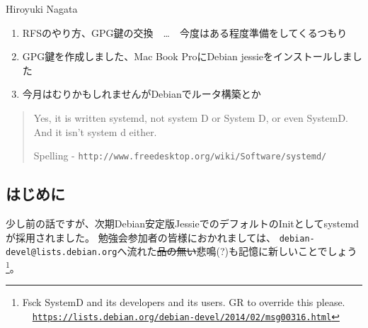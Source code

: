 \documentclass[mingoth,a4paper]{jsarticle}
\begin{document}
\begin{prework}{ Hiroyuki Nagata }
  \begin{enumerate}
  \item RFSのやり方、GPG鍵の交換　…　今度はある程度準備をしてくるつもり
  \item GPG鍵を作成しました、Mac Book ProにDebian jessieをインストールしました
  \item 今月はむりかもしれませんがDebianでルータ構築とか
  \end{enumerate}
\end{prework}


\begin{quote}
  Yes, it is written systemd, not system D or System D, or even
  SystemD. And it isn't system d either. \\
  \begin{flushright}
    Spelling - \texttt{http://www.freedesktop.org/wiki/Software/systemd/}
  \end{flushright}
\end{quote}

\subsection{はじめに}

少し前の話ですが、次期Debian安定版JessieでのデフォルトのInitとしてsystemdが採用されました。
勉強会参加者の皆様におかれましては、%
\texttt{debian-devel@lists.debian.org}へ流れた\sout{品の無い}悲鳴(?)も記憶に新しいことでしょう
\footnote{%
Fsck SystemD and its developers and its users. GR to override this please.\\
　\href{https://lists.debian.org/debian-devel/2014/02/msg00316.html}{\texttt{https://lists.debian.org/debian-devel/2014/02/msg00316.html}}%
}。
\end{document}
